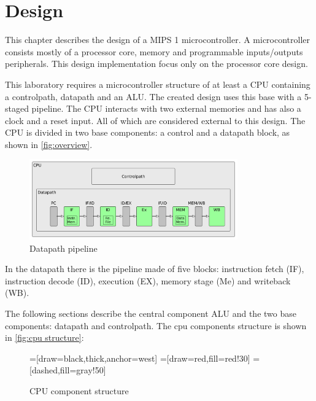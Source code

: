 \chapter{Design}
This chapter describes the design of a MIPS 1 microcontroller. A microcontroller consists mostly of a processor core, memory and programmable inputs/outputs peripherals. 
This design implementation focus only on the processor core design.

This laboratory requires a microcontroller structure of at least a CPU containing a controlpath, datapath and an ALU. The created design uses this base with a 5-staged pipeline.
The CPU interacts with two external memories and has also a clock and a reset input. All of which are considered external to this design.
The CPU is divided in two base components: a control and a datapath block, as shown  in \autoref{fig:overview}.



\begin{figure}[h!]
  \centering
  \includegraphics[width=0.8\textwidth]{figure/overview.png}
  \caption{Datapath pipeline}
  \label{fig:overview}
\end{figure}

In the datapath there is the pipeline made of five blocks: instruction fetch (IF), instruction decode (ID), execution (EX), memory stage (Me) and writeback (WB).

The following sections describe the central component ALU and the two base components: datapath and controlpath.
The cpu components structure is shown in \autoref{fig:cpu structure}:
\begin{figure}[h!]
\begin{center}
 =[draw=black,thick,anchor=west]
=[draw=red,fill=red!30]
=[dashed,fill=gray!50]
\caption{CPU component structure}
\label{fig:cpu structure}
\end{center}
\end{figure}

	
	
	
	
